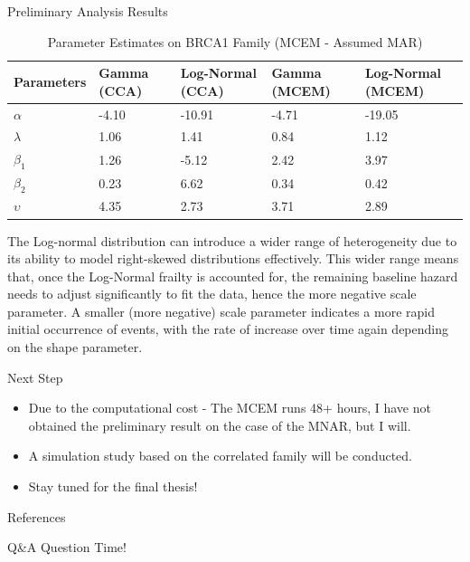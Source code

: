 \documentclass [aspectratio=169]{beamer}
\begin{document}
\begin{frame}{Preliminary Analysis Results} 
    \begin{table}[]
        \caption{Parameter Estimates on BRCA1 Family (MCEM - Assumed MAR)}
        \begin{tabular}{lllll}
        \hline
        Parameters & Gamma (CCA) & Log-Normal (CCA) & Gamma (MCEM) & Log-Normal (MCEM) \\ \hline
        $\alpha$   & -4.10               & -10.91                   & -4.71                & -19.05                    \\
        $\lambda$  & 1.06                & 1.41                     & 0.84                 & 1.12                      \\
        $\beta_1$  & 1.26                & -5.12                    & 2.42                 & 3.97                      \\
        $\beta_2$  & 0.23                & 6.62                     & 0.34                 & 0.42                      \\
        $\upsilon$ & 4.35                & 2.73                     & 3.71                 & 2.89                      \\ \hline
        \end{tabular}
        \end{table}
        The Log-normal distribution can introduce a wider range of heterogeneity due to its ability to model right-skewed distributions effectively. 
        This wider range means that, once the Log-Normal frailty is accounted for, the remaining baseline hazard needs to adjust significantly to fit the data, hence the more negative scale parameter.
        A smaller (more negative) scale parameter indicates a more rapid initial occurrence of events, with the rate of increase over time again depending on the shape parameter.
\end{frame}

\begin{frame}{Next Step} 
    \begin{itemize} 
        \item Due to the computational cost - The MCEM runs 48+ hours, I have not obtained the preliminary result on the case of the MNAR, but I will.
        \item A simulation study based on the correlated family will be conducted. 
        \item Stay tuned for the final thesis! 
    \end{itemize}
\end{frame}

\begin{frame}[t,allowframebreaks]{References}
    
    
\end{frame}

\begin{frame}{Q\&A}
    Question Time!
\end{frame}
\end{document}
